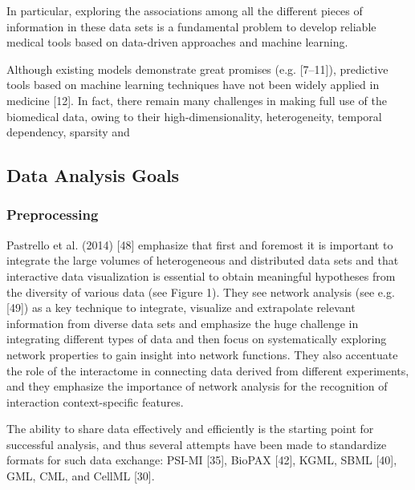 \documentclass[10pt,a4paper]{article}
\begin{document}
	 In particular, exploring the associations among all the different pieces of information in these data sets is a fundamental problem to develop reliable medical tools based on data-driven approaches and machine learning.  \cite{doi:10.1093/bib/bbx044}
	 
	Although existing models demonstrate great promises (e.g. [7–11]), predictive tools based on machine learning techniques have not been widely applied in medicine [12]. In fact, there remain many challenges in making full use of the biomedical data, owing to their high-dimensionality, heterogeneity, temporal dependency, sparsity and  \cite{doi:10.1093/bib/bbx044}
	
	\subsection{Data Analysis Goals}
	
	\subsubsection{Preprocessing}
	
	Pastrello et al. (2014) [48] emphasize that first and foremost it is important to
	integrate the large volumes of heterogeneous and distributed data sets and that
	interactive data visualization is essential to obtain meaningful hypotheses from the
	diversity of various data (see Figure 1). They see network analysis (see e.g. [49]) as
	a key technique to integrate, visualize and extrapolate relevant information from
	diverse data sets and emphasize the huge challenge in integrating different types of
	data and then focus on systematically exploring network properties to gain insight
	into network functions. They also accentuate the role of the interactome in connecting
	data derived from different experiments, and they emphasize the importance of
	network analysis for the recognition of interaction context-specific features. \cite{Holzinger2014}
	
	The ability to share data effectively and efficiently is the starting point for successful
	analysis, and thus several attempts have been made to standardize formats for such
	data exchange: PSI-MI [35], BioPAX [42], KGML, SBML [40], GML, CML, and
	CellML [30]. \cite{Otasek2014}
	
\end{document}
